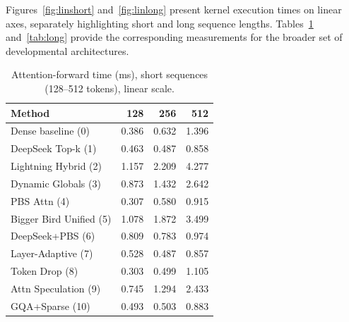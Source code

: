 \documentclass[11pt]{article}
\begin{document}
Figures~\ref{fig:linshort} and~\ref{fig:linlong} present kernel execution times on linear axes, separately highlighting short and long sequence lengths. Tables~\ref{tab:short} and~\ref{tab:long} provide the corresponding measurements for the broader set of developmental architectures.

\begin{table}[ht]
  \centering
  \small
  \caption{Attention-forward time (ms), short sequences (128--512 tokens),
  linear scale.}
  \label{tab:short}
  \begin{tabular}{@{}lrrr@{}}
    \toprule
    Method & 128 & 256 & 512 \\
    \midrule
    Dense baseline (0)        & 0.386 & 0.632 & 1.396 \\
    DeepSeek Top-k (1)        & 0.463 & 0.487 & 0.858 \\
    Lightning Hybrid (2)      & 1.157 & 2.209 & 4.277 \\
    Dynamic Globals (3)       & 0.873 & 1.432 & 2.642 \\
    PBS Attn (4)              & 0.307 & 0.580 & 0.915 \\
    Bigger Bird Unified (5)   & 1.078 & 1.872 & 3.499 \\
    DeepSeek+PBS (6)          & 0.809 & 0.783 & 0.974 \\
    Layer-Adaptive (7)        & 0.528 & 0.487 & 0.857 \\
    Token Drop (8)            & 0.303 & 0.499 & 1.105 \\
    Attn Speculation (9)      & 0.745 & 1.294 & 2.433 \\
    GQA+Sparse (10)           & 0.493 & 0.503 & 0.883 \\
    \bottomrule
  \end{tabular}
\end{table}
\end{document}
